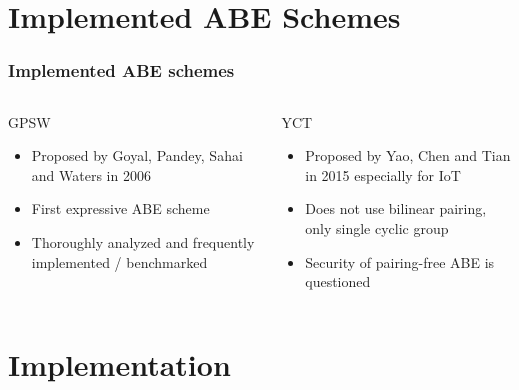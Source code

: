 \section{Implemented ABE Schemes}
\begin{frame}[c]
    \frametitle{Implemented ABE schemes}
    \begin{columns}[c]\centering
        \begin{block}{\centering GPSW}
            \centering
            \begin{itemize}
                \item Proposed by Goyal, Pandey, Sahai and Waters in 2006
                \item First expressive ABE scheme
                \item Thoroughly analyzed and frequently implemented / benchmarked
            \end{itemize}
        \end{block}

        \begin{block}{\centering YCT}
            \centering
            \begin{itemize}
                \item Proposed by Yao, Chen and Tian in 2015 especially for IoT
                \item Does not use bilinear pairing, only single cyclic group
                \item Security of pairing-free ABE is questioned
            \end{itemize}
        \end{block}
        
    \end{columns}
\end{frame}


\section{Implementation}

